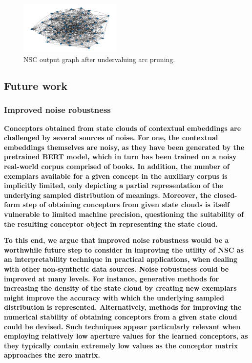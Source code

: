 \begin{figure}[h]
\centering
\includegraphics[width=0.45\textwidth]{img/short_run.png}
\caption{NSC output graph after undervaluing arc pruning.}\label{fig:pruning}
\end{figure}

\subsection{Future work}

\subsubsection{Improved noise robustness}

\textbf{Conceptors obtained from state clouds of contextual embeddings are challenged by several sources of noise. For one, the contextual embeddings themselves are noisy, as they have been generated by the pretrained BERT model, which in turn has been trained on a noisy real-world corpus comprised of books. In addition, the number of exemplars available for a given concept in the auxiliary corpus is implicitly limited, only depicting a partial representation of the underlying sampled distribution of meanings. Moreover, the closed-form step of obtaining conceptors from given state clouds is itself vulnerable to limited machine precision, questioning the suitability of the resulting conceptor object in representing the state cloud.}

\textbf{To this end, we argue that improved noise robustness would be a worthwhile future step to consider in improving the utility of NSC as an interpretability technique in practical applications, when dealing with other non-synthetic data sources. Noise robustness could be improved at many levels. For instance, generative methods for increasing the density of the state cloud by creating new exemplars might improve the accuracy with which the underlying sampled distribution is represented. Alternatively, methods for improving the numerical stability of obtaining conceptors from a given state cloud could be devised. Such techniques appear particularly relevant when employing relatively low aperture values for the learned conceptors, as they typically contain extremely low values as the conceptor matrix approaches the zero matrix.}

